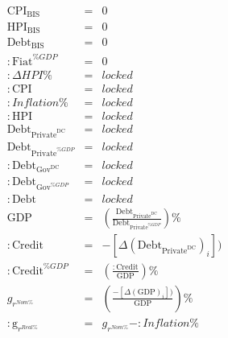 \documentclass{article}
\begin{document}
\begin{eqnarray*}
\mathrm{CPI}_{\mathrm{{BIS}}}&=&0\\
\mathrm{HPI}_{\mathrm{{BIS}}}&=&0\\
\mathrm{Debt}_{\mathrm{{BIS}}}&=&0\\
\mathrm{:Fiat}^{{\%GDP}}&=&0\\
:\Delta{HPI}\%&=&locked\\
\mathrm{:CPI}&=&locked\\
:Inflation\%&=&locked\\
\mathrm{:HPI}&=&locked\\
\mathrm{Debt}_{\mathrm{{Private}}^{\mathrm{{DC}}}}&=&locked\\
\mathrm{Debt}_{\mathrm{{Private}}^{{\%GDP}}}&=&locked\\
\mathrm{:Debt}_{\mathrm{{Gov}}^{\mathrm{{DC}}}}&=&locked\\
\mathrm{:Debt}_{\mathrm{{Gov}}^{{\%GDP}}}&=&locked\\
\mathrm{:Debt}&=&locked\\
\mathrm{GDP}&=&\left(\frac{\mathrm{Debt}_{\mathrm{{Private}}^{\mathrm{{DC}}}}}{\mathrm{Debt}_{\mathrm{{Private}}^{{\%GDP}}}}\right)\%\\
\mathrm{:Credit}&=&-\left[\Delta\left(\mathrm{Debt}_{\mathrm{{Private}}^{\mathrm{{DC}}}}\right)_i\right])\\
\mathrm{:Credit}^{{\%GDP}}&=&\left(\frac{\mathrm{:Credit}}{\mathrm{GDP}}\right)\%\\
g_{r^{{Nom}\%}}&=&\left(\frac{-\left[\Delta\left(\mathrm{GDP}\right)_i\right])}{\mathrm{GDP}}\right)\%\\
\mathrm{:g}_{r^{{Real}\%}}&=&g_{r^{{Nom}\%}}-:Inflation\%\\
\end{eqnarray*}
\end{document}
